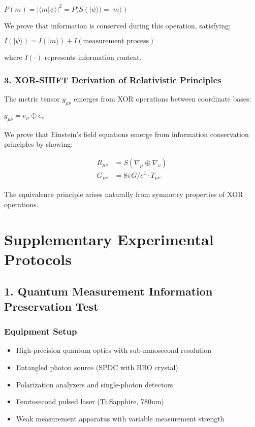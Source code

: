 \documentclass[10pt]{article}
\begin{document}
$P(m) = |\langle m|\psi\rangle|^2 = P(S(|\psi\rangle) = |m\rangle)$

We prove that information is conserved during this operation, satisfying:

$I(|\psi\rangle) = I(|m\rangle) + I(\text{measurement process})$

where $I(\cdot)$ represents information content.

\subsubsection*{3. XOR-SHIFT Derivation of Relativistic Principles}

The metric tensor $g_{\mu\nu}$ emerges from XOR operations between coordinate bases:

$g_{\mu\nu} = e_\mu \oplus e_\nu$

We prove that Einstein's field equations emerge from information conservation principles by showing:

\begin{align}
R_{\mu\nu} &= S(\nabla_\mu \oplus \nabla_\nu)\\
G_{\mu\nu} &= 8\pi G/c^4 \cdot T_{\mu\nu}
\end{align}

The equivalence principle arises naturally from symmetry properties of XOR operations.

\section*{Supplementary Experimental Protocols}

\subsection*{1. Quantum Measurement Information Preservation Test}

\subsubsection*{Equipment Setup}
\begin{itemize}
\item High-precision quantum optics with sub-nanosecond resolution
\item Entangled photon source (SPDC with BBO crystal)
\item Polarization analyzers and single-photon detectors
\item Femtosecond pulsed laser (Ti:Sapphire, 780nm)
\item Weak measurement apparatus with variable measurement strength
\end{itemize}
\end{document}
